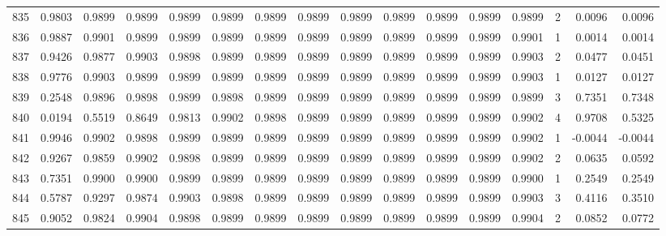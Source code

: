 \begin{tabular}{lrrrrrrrrrrrrrrr}
835 &      0.9803 &  0.9899 &  0.9899 &  0.9899 &  0.9899 &  0.9899 &  0.9899 &  0.9899 &  0.9899 &  0.9899 &   0.9899 &     0.9899 &      2 &                    0.0096 &                     0.0096 \\
836 &      0.9887 &  0.9901 &  0.9899 &  0.9899 &  0.9899 &  0.9899 &  0.9899 &  0.9899 &  0.9899 &  0.9899 &   0.9899 &     0.9901 &      1 &                    0.0014 &                     0.0014 \\
837 &      0.9426 &  0.9877 &  0.9903 &  0.9898 &  0.9899 &  0.9899 &  0.9899 &  0.9899 &  0.9899 &  0.9899 &   0.9899 &     0.9903 &      2 &                    0.0477 &                     0.0451 \\
838 &      0.9776 &  0.9903 &  0.9899 &  0.9899 &  0.9899 &  0.9899 &  0.9899 &  0.9899 &  0.9899 &  0.9899 &   0.9899 &     0.9903 &      1 &                    0.0127 &                     0.0127 \\
839 &      0.2548 &  0.9896 &  0.9898 &  0.9899 &  0.9898 &  0.9899 &  0.9899 &  0.9899 &  0.9899 &  0.9899 &   0.9899 &     0.9899 &      3 &                    0.7351 &                     0.7348 \\
840 &      0.0194 &  0.5519 &  0.8649 &  0.9813 &  0.9902 &  0.9898 &  0.9899 &  0.9899 &  0.9899 &  0.9899 &   0.9899 &     0.9902 &      4 &                    0.9708 &                     0.5325 \\
841 &      0.9946 &  0.9902 &  0.9898 &  0.9899 &  0.9899 &  0.9899 &  0.9899 &  0.9899 &  0.9899 &  0.9899 &   0.9899 &     0.9902 &      1 &                   -0.0044 &                    -0.0044 \\
842 &      0.9267 &  0.9859 &  0.9902 &  0.9898 &  0.9899 &  0.9899 &  0.9899 &  0.9899 &  0.9899 &  0.9899 &   0.9899 &     0.9902 &      2 &                    0.0635 &                     0.0592 \\
843 &      0.7351 &  0.9900 &  0.9900 &  0.9899 &  0.9899 &  0.9899 &  0.9899 &  0.9899 &  0.9899 &  0.9899 &   0.9899 &     0.9900 &      1 &                    0.2549 &                     0.2549 \\
844 &      0.5787 &  0.9297 &  0.9874 &  0.9903 &  0.9898 &  0.9899 &  0.9899 &  0.9899 &  0.9899 &  0.9899 &   0.9899 &     0.9903 &      3 &                    0.4116 &                     0.3510 \\
845 &      0.9052 &  0.9824 &  0.9904 &  0.9898 &  0.9899 &  0.9899 &  0.9899 &  0.9899 &  0.9899 &  0.9899 &   0.9899 &     0.9904 &      2 &                    0.0852 &                     0.0772 \\

\end{tabular}

